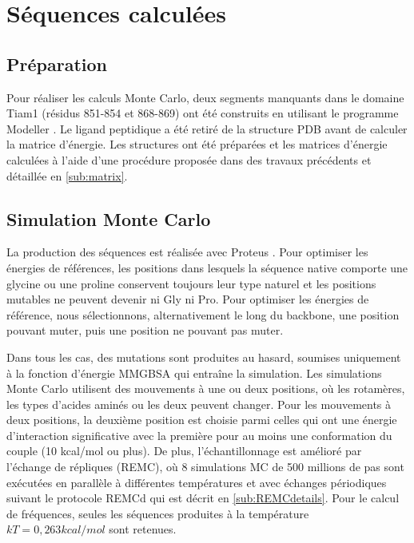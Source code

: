 \clearpage


\section{Séquences calculées}

\subsection{Préparation}
Pour réaliser les calculs Monte Carlo, deux segments manquants dans le domaine Tiam1 (résidus 851-854 et 868-869) ont été construits en utilisant le programme Modeller \cite{Eswar06}. Le ligand peptidique a été retiré de la structure PDB avant de calculer la matrice d'énergie. Les structures ont été préparées et les matrices d'énergie calculées à l'aide d'une procédure proposée dans des travaux précédents \cite{Schmidt08b, Schmidt09} et détaillée en \ref{sub:matrix}. 
 

\subsection{Simulation Monte Carlo}    
La production des séquences est réalisée avec Proteus \cite{Simonson13b}. Pour optimiser les énergies de références, les positions dans lesquels la séquence native comporte une glycine ou une proline conservent toujours leur type naturel et les positions mutables ne peuvent devenir ni Gly ni Pro. Pour optimiser les énergies de référence, nous sélectionnons, alternativement le long du backbone, une position pouvant muter, puis une position ne pouvant pas muter.

Dans tous les cas, des mutations sont produites au hasard, soumises uniquement à la fonction d'énergie MMGBSA qui entraîne la simulation. Les simulations Monte Carlo utilisent des mouvements à une ou deux positions, où les rotamères, les types d'acides aminés ou les deux peuvent changer. Pour les mouvements à deux positions, la deuxième position est choisie parmi celles qui ont une énergie d'interaction significative avec la première pour au moins une conformation du couple (10 kcal/mol ou plus). De plus, l'échantillonnage est amélioré par l'échange de répliques (REMC), où $8$ simulations MC de 500 millions de pas sont exécutées en parallèle à différentes températures et avec échanges périodiques suivant le protocole REMCd qui est décrit en \ref{sub:REMCdetails}. Pour le calcul de fréquences, seules les séquences produites à la température $kT=0,263 kcal/mol$ sont retenues. 

